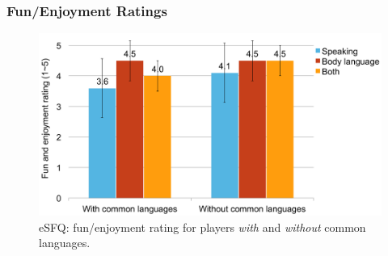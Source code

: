

\subsubsection{Fun/Enjoyment Ratings}



\begin{figure}[!b]
\centering
\includegraphics[width=0.9\columnwidth]{Figures/US_Fun.pdf}
\caption{eSFQ: fun/enjoyment rating for players \textit{with} and \textit{without} common languages.}
\label{fig:US_Fun}
\end{figure}




